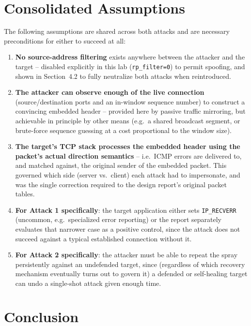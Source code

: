 \documentclass[11pt]{article}
\begin{document}
\section{Consolidated Assumptions}

The following assumptions are shared across both attacks and are
necessary preconditions for either to succeed at all:

\begin{enumerate}
    \item \textbf{No source-address filtering} exists anywhere between
    the attacker and the target -- disabled explicitly in this lab
    (\texttt{rp\_filter=0}) to permit spoofing, and shown in
    Section~4.2 to fully neutralize both attacks when reintroduced.
    \item \textbf{The attacker can observe enough of the live
    connection} (source/destination ports and an in-window sequence
    number) to construct a convincing embedded header -- provided here
    by passive traffic mirroring, but achievable in principle by other
    means (e.g.\ a shared broadcast segment, or brute-force sequence
    guessing at a cost proportional to the window size).
    \item \textbf{The target's TCP stack processes the embedded
    header using the packet's actual direction semantics} -- i.e.\ ICMP
    errors are delivered to, and matched against, the original sender
    of the embedded packet. This governed which side (server vs.\
    client) each attack had to impersonate, and was the single
    correction required to the design report's original packet tables.
    \item \textbf{For Attack 1 specifically}: the target application
    either sets \texttt{IP\_RECVERR} (uncommon, e.g.\ specialized error
    reporting) or the report separately evaluates that narrower case as
    a positive control, since the attack does not succeed against a
    typical established connection without it.
    \item \textbf{For Attack 2 specifically}: the attacker must be able
    to repeat the spray persistently against an undefended target,
    since (regardless of which recovery mechanism eventually turns out
    to govern it) a defended or self-healing target can undo a
    single-shot attack given enough time.
\end{enumerate}

\section{Conclusion}
\end{document}
